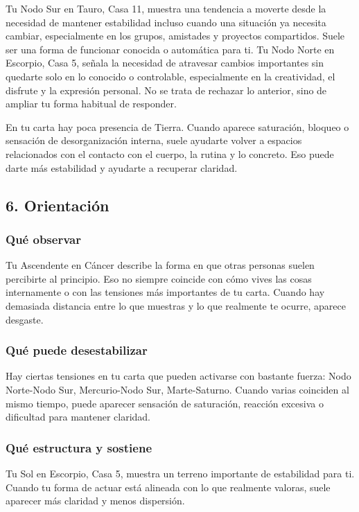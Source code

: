 \documentclass[11pt,a4paper]{article}\usepackage[utf8]{inputenc}
\begin{document}
\vspace{0.3cm}
Tu Nodo Sur en Tauro, Casa 11, muestra una tendencia a moverte desde la necesidad de mantener estabilidad incluso cuando una situación ya necesita cambiar, especialmente en los grupos, amistades y proyectos compartidos. Suele ser una forma de funcionar conocida o automática para ti. Tu Nodo Norte en Escorpio, Casa 5, señala la necesidad de atravesar cambios importantes sin quedarte solo en lo conocido o controlable, especialmente en la creatividad, el disfrute y la expresión personal. No se trata de rechazar lo anterior, sino de ampliar tu forma habitual de responder.

\vspace{0.3cm}
En tu carta hay poca presencia de Tierra. Cuando aparece saturación, bloqueo o sensación de desorganización interna, suele ayudarte volver a espacios relacionados con el contacto con el cuerpo, la rutina y lo concreto. Eso puede darte más estabilidad y ayudarte a recuperar claridad.

\vspace{0.8cm}

\subsection{6. Orientación}

\subsubsection*{Qué observar}
Tu Ascendente en Cáncer describe la forma en que otras personas suelen percibirte al principio. Eso no siempre coincide con cómo vives las cosas internamente o con las tensiones más importantes de tu carta. Cuando hay demasiada distancia entre lo que muestras y lo que realmente te ocurre, aparece desgaste.

\subsubsection*{Qué puede desestabilizar}
Hay ciertas tensiones en tu carta que pueden activarse con bastante fuerza: Nodo Norte-Nodo Sur, Mercurio-Nodo Sur, Marte-Saturno. Cuando varias coinciden al mismo tiempo, puede aparecer sensación de saturación, reacción excesiva o dificultad para mantener claridad.

\subsubsection*{Qué estructura y sostiene}
Tu Sol en Escorpio, Casa 5, muestra un terreno importante de estabilidad para ti. Cuando tu forma de actuar está alineada con lo que realmente valoras, suele aparecer más claridad y menos dispersión.
\end{document}

